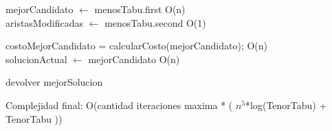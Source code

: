 \begin{algorithm}[H]
{{{		mejorCandidato $\leftarrow$ menosTabu.first \hfill O(n)\\
		aristasModificadas $\leftarrow$ menosTabu.second \hfill O(1)\\
	}  	
	
	costoMejorCandidato = calcularCosto(mejorCandidato); \hfill O(n) \\
	
	solucionActual $\leftarrow$ mejorCandidato \hfill O(n)\\
		

  	

}

devolver mejorSolucion \\

}

Complejidad final: O(cantidad iteraciones maxima * ( $n^5$*log(TenorTabu) + TenorTabu ))

\end{algorithm}

